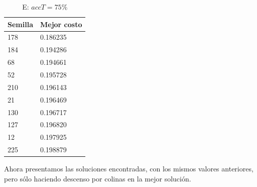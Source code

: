 \documentclass{article}
\begin{document}
\begin{table}[!htbp]
    \begin{minipage}{\linewidth}
      \centering
      \caption{E: $accT = 75 \%$}
      \begin{tabular}{l|l}
        Semilla & Mejor costo \\
        \hline
        178     & 0.186235 \\
        \hline
        184     & 0.194286 \\
        \hline
        68      & 0.194661 \\
        \hline
        52      & 0.195728 \\
        \hline
        210     & 0.196143 \\
        \hline
        21      & 0.196469 \\
        \hline
        130     & 0.196717 \\
        \hline
        127     & 0.196820 \\
        \hline
        12      & 0.197925 \\
        \hline
        225     & 0.198879 \\
      \end{tabular}
    \end{minipage} 
  \end{table}

  \clearpage

  Ahora presentamos las soluciones encontradas, con los mismos 
  valores anteriores, pero sólo haciendo descenso por colinas en 
  la mejor solución.
\end{document}

